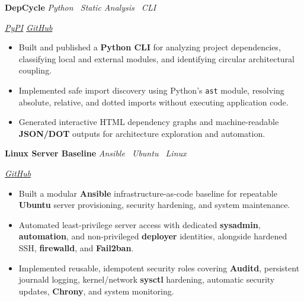 \documentclass[10pt,a4paper]{article}
\newcommand{\projectentry}[3]{%
    \noindent
    \begin{minipage}[t]{0.62\linewidth}
        \raggedright
        \textbf{#1}
        \hspace{0.7em}
        \textit{\color{textgray}#2}
    \end{minipage}%
    \hfill
    \begin{minipage}[t]{0.34\linewidth}
        \raggedleft
        \itshape\color{textgray}#3
    \end{minipage}%
    \par
}
\begin{document}
\vspace{3pt}

\projectentry
    {DepCycle}
    {Python \textperiodcentered\ Static Analysis \textperiodcentered\ CLI}
    {\href{https://pypi.org/project/depcycle/}{PyPI} \quad \href{https://github.com/Matricess/depcycle}{GitHub}}
\vspace{2pt}
\begin{itemize}
    \item Built and published a \textbf{Python CLI} for analyzing project dependencies, classifying local and external modules, and identifying circular architectural coupling.
    \item Implemented safe import discovery using Python's \texttt{ast} module, resolving absolute, relative, and dotted imports without executing application code.
    \item Generated interactive HTML dependency graphs and machine-readable \textbf{JSON/DOT} outputs for architecture exploration and automation.
\end{itemize}

\vspace{3pt}

\projectentry
    {Linux Server Baseline}
    {Ansible \textperiodcentered\ Ubuntu \textperiodcentered\ Linux}
    {\href{https://github.com/Kishan-Thanki/linux-server-baseline}{GitHub}}
\vspace{2pt}
\begin{itemize}
    \item Built a modular \textbf{Ansible} infrastructure-as-code baseline for repeatable \textbf{Ubuntu} server provisioning, security hardening, and system maintenance.
    \item Automated least-privilege server access with dedicated \textbf{sysadmin}, \textbf{automation}, and non-privileged \textbf{deployer} identities, alongside hardened SSH, \textbf{firewalld}, and \textbf{Fail2ban}.
    \item Implemented reusable, idempotent security roles covering \textbf{Auditd}, persistent journald logging, kernel/network \textbf{sysctl} hardening, automatic security updates, \textbf{Chrony}, and system monitoring.
\end{itemize}
\end{document}
